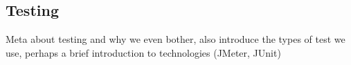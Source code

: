 \subsection{Testing}
Meta about testing and why we even bother, also introduce the types of test we use, perhaps a brief introduction to technologies (JMeter, JUnit)